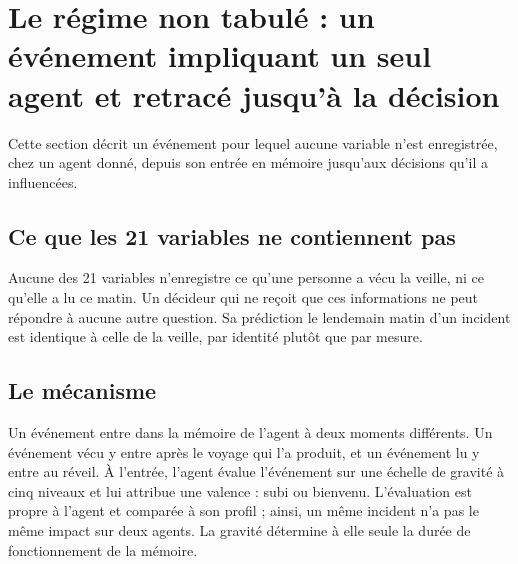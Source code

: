 
\section{Le régime non tabulé : un événement impliquant un seul agent et retracé jusqu'à la décision}
\label{sec:nontabulated}

Cette section décrit un événement pour lequel aucune variable n’est enregistrée, chez un agent donné, depuis son entrée en mémoire jusqu’aux décisions qu’il a influencées.

\subsection{Ce que les 21 variables ne contiennent pas}
\label{sec:variables-gap}

Aucune des 21 variables n’enregistre ce qu’une personne a vécu la veille, ni ce qu’elle a lu ce matin. Un décideur qui ne reçoit que ces informations ne peut répondre à aucune autre question. Sa prédiction le lendemain matin d’un incident est identique à celle de la veille, par identité plutôt que par mesure.

\subsection{Le mécanisme}
\label{sec:mechanism}

Un événement entre dans la mémoire de l’agent à deux moments différents. Un événement vécu y entre après le voyage qui l’a produit, et un événement lu y entre au réveil. À l’entrée, l’agent évalue l’événement sur une échelle de gravité à cinq niveaux et lui attribue une valence : subi ou bienvenu. L’évaluation est propre à l’agent et comparée à son profil ; ainsi, un même incident n’a pas le même impact sur deux agents. La gravité détermine à elle seule la durée de fonctionnement de la mémoire.

